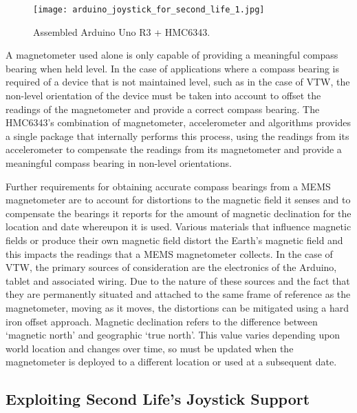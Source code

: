 
\begin{figure}[h]
\centering
  \texttt{[image: arduino\_joystick\_for\_second\_life\_1.jpg]}
  \caption{Assembled Arduino Uno R3 + HMC6343.}
  \label{arduino_joystick_for_second_life_1.jpg}
\end{figure}

A magnetometer used alone is only capable of providing a meaningful compass bearing when held level. In the case of applications where a compass bearing is required of a device that is not maintained level, such as in the case of VTW, the non-level orientation of the device must be taken into account to offset the readings of the magnetometer and provide a correct compass bearing. The HMC6343's combination of magnetometer, accelerometer and algorithms provides a single package that internally performs this process, using the readings from its accelerometer to compensate the readings from its magnetometer and provide a meaningful compass bearing in non-level orientations.

Further requirements for obtaining accurate compass bearings from a MEMS magnetometer are to account for distortions to the magnetic field it senses and to compensate the bearings it reports for the amount of magnetic declination for the location and date whereupon it is used. Various materials that influence magnetic fields or produce their own magnetic field distort the Earth's magnetic field and this impacts the readings that a MEMS magnetometer collects. In the case of VTW, the primary sources of consideration are the electronics of the Arduino, tablet and associated wiring. Due to the nature of these sources and the fact that they are permanently situated and attached to the same frame of reference as the magnetometer, moving as it moves, the distortions can be mitigated using a hard iron offset approach. Magnetic declination refers to the difference between `magnetic north' and geographic `true north'. This value varies depending upon world location and changes over time, so must be updated when the magnetometer is deployed to a different location or used at a subsequent date.



\subsection{Exploiting Second Life's Joystick Support}

